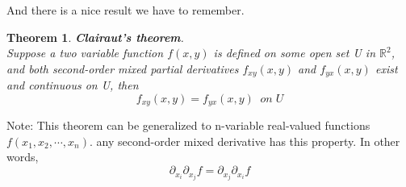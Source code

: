 \documentclass{article}
\newtheorem{thm}{Theorem}
\begin{document}
And there is a nice result we have to remember.
\begin{thm}
	\textbf{Clairaut's theorem}.\\
	Suppose a two variable function $f(x,y)$ is defined on some open set U in $\mathbb{R}^2$, and both second-order mixed partial derivatives $f_{xy}(x,y)$ and $f_{yx}(x,y)$ exist and continuous on U, then
	\[ f_{xy}(x,y) = f_{yx}(x,y)\;\;on\;U \]
\end{thm}
Note: This theorem can be generalized to n-variable real-valued functions $f(x_1,x_2,\cdots,x_n)$. any second-order mixed derivative has this property. In other words,
\[ \partial_{x_i}\partial_{x_j} f = \partial_{x_j}\partial_{x_i} f \]  
\end{document}
